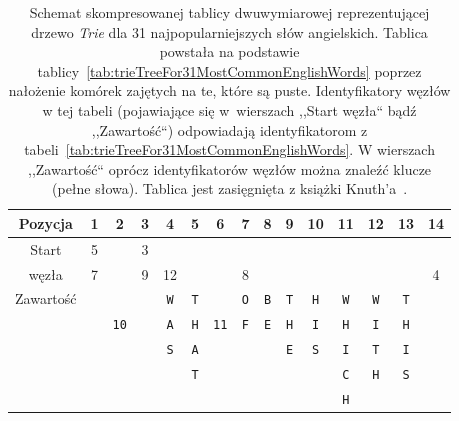 	\begin{table}
		\centering
		\begin{threeparttable}
			\caption{Schemat skompresowanej tablicy dwuwymiarowej reprezentującej drzewo \emph{Trie} dla 31 najpopularniejszych słów angielskich. Tablica powstała na podstawie tablicy~\ref{tab:trieTreeFor31MostCommonEnglishWords} poprzez nałożenie komórek zajętych na te, które są puste. Identyfikatory węzłów w tej tabeli (pojawiające się w~wierszach ,,Start węzła`` bądź ,,Zawartość``) odpowiadają identyfikatorom z tabeli~\ref{tab:trieTreeFor31MostCommonEnglishWords}. W wierszach ,,Zawartość`` oprócz identyfikatorów węzłów można znaleźć klucze (pełne słowa). Tablica jest zasięgnięta z książki Knuth'a~\cite{KnuthsTheArtOfComputerProgramming3}.}\label{tab:compressedTrieTreeFor31MostCommonEnglishWords}
			
			{ \small
				\begin{tabularx}{\textwidth}{C{5.4}|C{1.2}|C{1.2}|C{1.2}|C{1.2}|C{1.2}|C{1.2}|C{1.2}|C{1.2}|C{1.2}|C{1.2}|C{1.2}|C{1.2}|C{1.2}|C{1.2}}
					Pozycja & 1 & 2 & 3 & 4 & 5 & 6 & 7 & 8 & 9 & 10 & 11 & 12 & 13 & 14 \\
					\toprule
					Start & 5\tnote{W} && 3 &&&&&&&&&&& \\
					węzła & 7\tnote{W} && 9 & 12 &&& 8 &&&&&&& 4 \\
					\hline
					Zawartość &&&& \texttt{W} & \texttt{T} && \texttt{O} & \texttt{B} & \texttt{T} & \texttt{H} & \texttt{W} & \texttt{W} & \texttt{T} & \\
					
					&& \texttt{10} && \texttt{A} & \texttt{H} & \texttt{11} & \texttt{F} & \texttt{E} & \texttt{H} & \texttt{I} & \texttt{H} & \texttt{I} & \texttt{H} & \\
					
					&&&& \texttt{S} & \texttt{A} &&&& \texttt{E} & \texttt{S} & \texttt{I} & \texttt{T} & \texttt{I} & \\
					
					&&&&            & \texttt{T} &&&&&& \texttt{C} & \texttt{H} & \texttt{S} & \\
					
					&&&&&&&&&&& \texttt{H} &&& \\
					\hline
					\hline
				\end{tabularx}
			}
			
			
			

\end{threeparttable}
\end{table}
